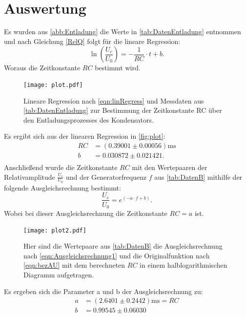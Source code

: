 \section{Auswertung}
\label{sec:Auswertung}
Es wurden aus \autoref{abb:Entladung} die Werte in \autoref{tab:DatenEntladung} entnommen und nach Gleichung \eqref{RelQ} folgt 
für die lineare Regression:
\begin{equation}
  \label{eqn:linRegress}
    \ln\left(\frac{U_c}{U_0}\right)=-\frac{1}{RC}\cdot t + b.
\end{equation}
Woraus die Zeitkonstante $RC$ bestimmt wird.

\begin{figure}
  \centering
  \texttt{[image: plot.pdf]}
  \caption{Lineare Regression nach \eqref{eqn:linRegress} und Messdaten aus \autoref{tab:DatenEntladung} zur Bestimmung der Zeitkonstante RC über den Entladungsprozesses des Kondensators.}
  \label{fig:plot}
\end{figure}

Es ergibt sich aus der linearen Regression in \autoref{fig:plot}:
\begin{align*}
  RC &= (0.39001\pm 0.00056)\unit{\milli\second}\\
  b &= 0.030872\pm 0.021421.\\
\end{align*}
Anschließend wurde die Zeitkonstante $RC$ mit den Wertepaaren der Relativamplitude $\frac{U_c}{U_0}$ und der Generatorfrequenz $f$
aus \autoref{tab:DatenB} mithilfe der folgende Ausgleichsrechnung bestimmt:
\begin{equation}
  \label{eqn:Ausgleichsrechnung1}
  \frac{U_c}{U_0} = e^{(-a\cdot f + b)}.
\end{equation}
Wobei bei dieser Ausgleichsrechnung die Zeitkonstante $RC = a$ ist.
\begin{figure}
  \centering
  \texttt{[image: plot2.pdf]}
  \caption{Hier sind die Wertepaare aus \autoref{tab:DatenB} die Ausgleichsrechnung nach \eqref{eqn:Ausgleichsrechnung1} und die Originalfunktion nach \eqref{eqn:bezAU} mit dem berechneten $RC$ in einem halblogarithmischen Diagramm aufgetragen.}
  \label{fig:plot2}
\end{figure}

Es ergeben sich die Parameter a und b der Ausgleichsrechnung zu:
\begin{align*}
  a &= (2.6401\pm 0.2442) \unit{\milli\second} = RC\\
  b &= 0.99545\pm 0.06030\\
\end{align*}

